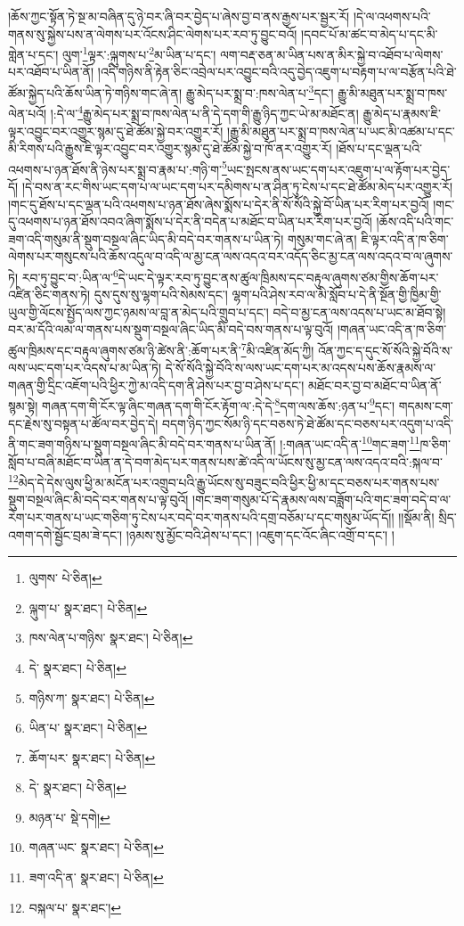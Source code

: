 །ཆོས་ཀྱང་སྟོན་ཏེ་སྔ་མ་བཞིན་དུ་ཉེ་བར་ཞི་བར་བྱེད་པ་ཞེས་བྱ་བ་ནས་རྒྱས་པར་སྦྱར་རོ། །དེ་ལ་འཕགས་པའི་གནས་སུ་སྐྱེས་པས་ན་ལེགས་པར་འོངས་ཤིང་ལེགས་པར་རབ་ཏུ་བྱུང་བའོ། །དབང་པོ་མ་ཚང་བ་མེད་པ་དང་མི་གླེན་པ་དང་། ལུག་\footnote{ལུགས་  པེ་ཅིན། }ལྟར་:ལྐུགས་པ་\footnote{ལྐུག་པ་  སྣར་ཐང་།  པེ་ཅིན། }མ་ཡིན་པ་དང་། ལག་བརྡ་ཅན་མ་ཡིན་པས་ན་མིར་སྐྱེ་བ་འཐོབ་པ་ལེགས་པར་འཐོབ་པ་ཡིན་ནོ། །འདི་གཉིས་ནི་རྟེན་ཅིང་འབྲེལ་པར་འབྱུང་བའི་འདུ་བྱེད་འཇུག་པ་བརྟག་པ་ལ་བརྩོན་པའི་ཐེ་ཚོམ་སྐྱེད་པའི་ཆོས་ཡིན་ཏེ་གཉིས་གང་ཞེ་ན། རྒྱུ་མེད་པར་སྨྲ་བ་:ཁས་ལེན་པ་\footnote{ཁས་ལེན་པ་གཉིས་  སྣར་ཐང་།  པེ་ཅིན། }དང་། རྒྱུ་མི་མཐུན་པར་སྨྲ་བ་ཁས་ལེན་པའོ། །:དེ་ལ་\footnote{དེ་  སྣར་ཐང་།  པེ་ཅིན། }རྒྱུ་མེད་པར་སྨྲ་བ་ཁས་ལེན་པ་ནི་དེ་དག་གི་རྒྱུ་ཉིད་ཀྱང་ཡེ་མ་མཐོང་ན། རྒྱུ་མེད་པ་རྣམས་ཇི་ལྟར་འབྱུང་བར་འགྱུར་སྙམ་དུ་ཐེ་ཚོམ་སྐྱེ་བར་འགྱུར་རོ། །རྒྱུ་མི་མཐུན་པར་སྨྲ་བ་ཁས་ལེན་པ་ཡང་མི་འཚམ་པ་དང་མི་རིགས་པའི་རྒྱུས་ཇི་ལྟར་འབྱུང་བར་འགྱུར་སྙམ་དུ་ཐེ་ཚོམ་སྐྱེ་བ་ཁོ་ནར་འགྱུར་རོ། །ཐོས་པ་དང་ལྡན་པའི་འཕགས་པ་ཉན་ཐོས་ནི་ཉེས་པར་སྨྲ་བ་རྣམ་པ་:གཉི་ག་\footnote{གཉིས་ཀ་  སྣར་ཐང་།  པེ་ཅིན། }ཡང་སྤངས་ནས་ཡང་དག་པར་འཇུག་པ་ལ་རྟོག་པར་བྱེད་དོ། །དེ་བས་ན་རང་གིས་ཡང་དག་པ་ལ་ཡང་དག་པར་དམིགས་པ་ན་ཤིན་ཏུ་ངེས་པ་དང་ཐེ་ཚོམ་མེད་པར་འགྱུར་རོ། །གང་དུ་ཐོས་པ་དང་ལྡན་པའི་འཕགས་པ་ཉན་ཐོས་ཞེས་སྨོས་པ་དེར་ནི་སོ་སོའི་སྐྱེ་བོ་ཡིན་པར་རིག་པར་བྱའོ། །གང་དུ་འཕགས་པ་ཉན་ཐོས་འབའ་ཞིག་སྨོས་པ་དེར་ནི་བདེན་པ་མཐོང་བ་ཡིན་པར་རིག་པར་བྱའོ། །ཆོས་འདི་པའི་གང་ཟག་འདི་གསུམ་ནི་སྡུག་བསྔལ་ཞིང་ཡིད་མི་བདེ་བར་གནས་པ་ཡིན་ཏེ། གསུམ་གང་ཞེ་ན། ཇི་ལྟར་འདི་ན་ཁ་ཅིག་ལེགས་པར་གསུངས་པའི་ཆོས་འདུལ་བ་འདི་ལ་མྱ་ངན་ལས་འདའ་བར་འདོད་ཅིང་མྱ་ངན་ལས་འདའ་བ་ལ་ཞུགས་ཏེ། རབ་ཏུ་བྱུང་བ་:ཡིན་ལ་\footnote{ཡིན་པ་  སྣར་ཐང་།  པེ་ཅིན། }དེ་ཡང་དེ་ལྟར་རབ་ཏུ་བྱུང་ནས་ཚུལ་ཁྲིམས་དང་བརྟུལ་ཞུགས་ཙམ་གྱིས་ཆོག་པར་འཛིན་ཅིང་གནས་ཏེ། དུས་དུས་སུ་ལྷག་པའི་སེམས་དང་། ལྷག་པའི་ཤེས་རབ་ལ་མི་སློབ་པ་དེ་ནི་སྔོན་གྱི་ཁྱིམ་གྱི་ཡུལ་གྱི་ལོངས་སྤྱོད་ལས་ཀྱང་ཉམས་ལ་བླ་ན་མེད་པའི་གྲུབ་པ་དང་། བདེ་བ་མྱ་ངན་ལས་འདས་པ་ཡང་མ་ཐོབ་སྟེ། བར་མ་དོའི་ལམ་ལ་གནས་པས་སྡུག་བསྔལ་ཞིང་ཡིད་མི་བདེ་བས་གནས་པ་ལྟ་བུའོ། །གཞན་ཡང་འདི་ན་ཁ་ཅིག་ཚུལ་ཁྲིམས་དང་བརྟུལ་ཞུགས་ཙམ་ཉི་ཚེས་ནི་:ཆོག་པར་ནི་\footnote{ཆོག་པར་  སྣར་ཐང་།  པེ་ཅིན། }མི་འཛིན་མོད་ཀྱི། འོན་ཀྱང་ད་དུང་སོ་སོའི་སྐྱེ་བོའི་ས་ལས་ཡང་དག་པར་འདས་པ་མ་ཡིན་ཏེ། དེ་སོ་སོའི་སྐྱེ་བོའི་ས་ལས་ཡང་དག་པར་མ་འདས་པས་ཆོས་རྣམས་ལ་གཞན་གྱི་དྲིང་འཇོག་པའི་ཕྱིར་ཀྱེ་མ་འདི་དག་ནི་ཤེས་པར་བྱ་བ་ཤེས་པ་དང་། མཐོང་བར་བྱ་བ་མཐོང་བ་ཡིན་ནོ་སྙམ་སྟེ། གཞན་དག་གི་ངོར་ལྟ་ཞིང་གཞན་དག་གི་ངོར་རྟོག་ལ་:དེ་དེ་\footnote{དེ་  སྣར་ཐང་།  པེ་ཅིན། }དག་ལས་ཆོས་:ཉན་པ་\footnote{མཉན་པ་  སྡེ་དགེ། }དང་། གདམས་ངག་དང་རྗེས་སུ་བསྟན་པ་ཚོལ་བར་བྱེད་དེ། བདག་ཉིད་ཀྱང་སོམ་ཉི་དང་བཅས་ཏེ་ཐེ་ཚོམ་དང་བཅས་པར་འདུག་པ་འདི་ནི་གང་ཟག་གཉིས་པ་སྡུག་བསྔལ་ཞིང་མི་བདེ་བར་གནས་པ་ཡིན་ནོ། །:གཞན་ཡང་འདི་ན་\footnote{གཞན་ཡང་  སྣར་ཐང་།  པེ་ཅིན། }གང་ཟག་\footnote{ཟག་འདི་ན་  སྣར་ཐང་།  པེ་ཅིན། }ཁ་ཅིག་སློབ་པ་བཞི་མཐོང་བ་ཡིན་ན་དེ་བག་མེད་པར་གནས་པས་ཚེ་འདི་ལ་ཡོངས་སུ་མྱ་ངན་ལས་འདའ་བའི་:སྐལ་བ་\footnote{བསྐལ་པ་  སྣར་ཐང་། }མེད་དེ་དེས་ལུས་ཕྱི་མ་མངོན་པར་འགྲུབ་པའི་རྒྱུ་ཡོངས་སུ་བཟུང་བའི་ཕྱིར་ཕྱི་མ་དང་བཅས་པར་གནས་པས་སྡུག་བསྔལ་ཞིང་མི་བདེ་བར་གནས་པ་ལྟ་བུའོ། །གང་ཟག་གསུམ་པོ་དེ་རྣམས་ལས་བཟློག་པའི་གང་ཟག་བདེ་བ་ལ་རེག་པར་གནས་པ་ཡང་གཅིག་ཏུ་ངེས་པར་བདེ་བར་གནས་པའི་དགྲ་བཅོམ་པ་དང་གསུམ་ཡོད་དོ།། །།སྡོམ་ནི། སྲིད་འགག་དགེ་སྦྱོང་བྲམ་ཟེ་དང་། །ཉམས་སུ་མྱོང་བའི་ཤེས་པ་དང་། །འཇུག་དང་འོང་ཞིང་འགྲོ་བ་དང་། །

